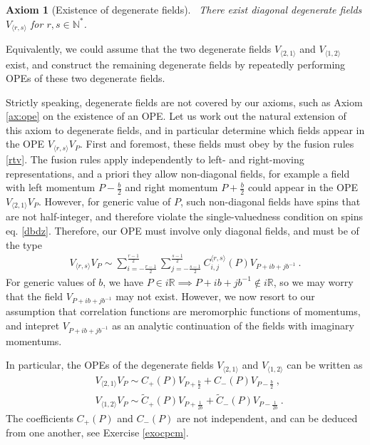 \documentclass[12pt, a4paper, notitlepage, twoside]{report}
\numberwithin{equation}{section}
\theoremstyle{break}
\newtheorem{hyp}{Axiom}[chapter]
\begin{document}
\begin{hyp}[Existence of degenerate fields]
 ~\label{ax:edf}
There exist diagonal degenerate fields $V_{\langle r,s \rangle}$ for $r,s\in\mathbb{N}^*$.
\end{hyp}
\noindent
Equivalently, we could assume that the two degenerate fields $V_{\langle 2,1\rangle}$ and $V_{\langle 1,2\rangle}$ exist, and construct the remaining degenerate fields by repeatedly performing OPEs of these two degenerate fields.

Strictly speaking, degenerate fields are not covered by our axioms, such as Axiom \ref{ax:ope} on the existence of an OPE.
Let us work out the natural extension of this axiom to degenerate fields, and in particular determine which fields appear in the OPE $V_{\langle r,s \rangle} V_P$. First and foremost, these fields must obey by the fusion rules
\eqref{rtv}. The fusion rules apply independently to left- and right-moving representations, and  a priori they allow non-diagonal fields, for example a field with left momentum $P-\frac{b}{2}$ and right momentum $P+\frac{b}{2}$ could appear in the OPE $V_{\langle 2,1\rangle} V_P$. However, for generic value of $P$, such non-diagonal fields have spins that are not half-integer, and therefore violate the single-valuedness condition on spins eq. \eqref{dbdz}.
Therefore, our OPE must involve only diagonal fields, and must be of the type
\begin{align}
 \boxed{V_{\langle r,s \rangle} V_P \sim \sum_{i=-\frac{r-1}{2}}^{\frac{r-1}{2}} \sum_{j=-\frac{s-1}{2}}^{\frac{s-1}{2}}  C_{i,j}^{\langle r,s \rangle}(P) V_{P + ib+jb^{-1}}}\ .
\label{vrsv}
\end{align}
For generic values of $b$, we have $P\in i\mathbb{R} \implies P+ib+jb^{-1}\notin i\mathbb{R}$, so we may worry that the field $ V_{P + ib+jb^{-1}}$ may not exist. However, we now resort to our assumption that correlation functions are meromorphic functions of momentums, and intepret $ V_{P + ib+jb^{-1}}$ as an analytic continuation of the fields with imaginary momentums.

In particular, the OPEs of the degenerate fields $V_{\langle 2,1\rangle}$ and $V_{\langle 1,2\rangle}$ can be written as 
\begin{align}
 &\boxed{V_{\langle 2,1 \rangle} V_P \sim C_+(P) V_{P+\frac{b}{2}} + C_-(P) V_{P-\frac{b}{2}}}\ ,
\label{vot}
\\
& \boxed{V_{\langle 1,2 \rangle} V_P \sim \tilde{C}_+(P) V_{P+\frac{1}{2b}} + \tilde{C}_-(P) V_{P-\frac{1}{2b}}}\ .
 \label{vto}
\end{align}
The coefficients $C_+(P)$ and $C_-(P)$ are not independent, and can be deduced from one another, see Exercise \ref{exocpcm}.
\end{document}
